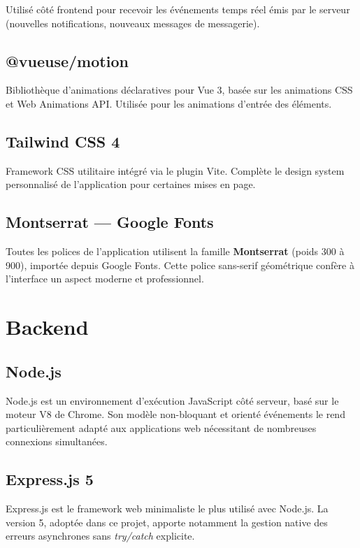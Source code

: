 \documentclass[12pt, a4paper]{report}
\begin{document}
Utilisé côté frontend pour recevoir les événements temps réel émis par le
serveur (nouvelles notifications, nouveaux messages de messagerie).

\subsection{@vueuse/motion}

Bibliothèque d'animations déclaratives pour Vue 3, basée sur les animations
CSS et Web Animations API. Utilisée pour les animations d'entrée des éléments.

\subsection{Tailwind CSS 4}

Framework CSS utilitaire intégré via le plugin Vite. Complète le design system
personnalisé de l'application pour certaines mises en page.

\subsection{Montserrat — Google Fonts}

Toutes les polices de l'application utilisent la famille \textbf{Montserrat}
(poids 300 à 900), importée depuis Google Fonts. Cette police sans-serif
géométrique confère à l'interface un aspect moderne et professionnel.

\section{Backend}

\subsection{Node.js}

Node.js est un environnement d'exécution JavaScript côté serveur, basé sur
le moteur V8 de Chrome. Son modèle non-bloquant et orienté événements le rend
particulièrement adapté aux applications web nécessitant de nombreuses
connexions simultanées.

\subsection{Express.js 5}

Express.js est le framework web minimaliste le plus utilisé avec Node.js.
La version 5, adoptée dans ce projet, apporte notamment la gestion native des
erreurs asynchrones sans \textit{try/catch} explicite.
\end{document}
